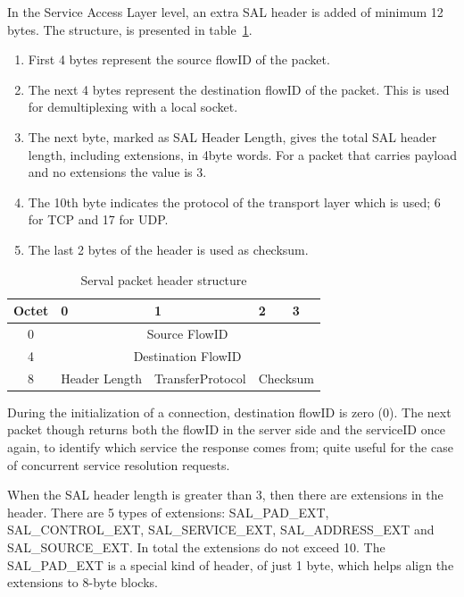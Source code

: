 In the Service Access Layer level, an extra SAL header is added of minimum 12 bytes.
The structure, is presented in table~\ref{table:salheader}.
\begin{enumerate} \itemsep1pt \parskip0pt 
  \item First 4 bytes represent the source flowID of the packet.
  \item The next 4 bytes represent the destination flowID of the packet.
  This is used for demultiplexing with a local socket.
  \item The next byte, marked as SAL Header Length, gives the total SAL header length, including extensions, in 4byte words.
  For a packet that carries payload and no extensions the value is 3.
  \item The 10th byte indicates the protocol of the transport layer which is used; 6 for TCP and 17 for UDP.
  \item The last 2 bytes of the header is used as checksum.
\end{enumerate}

\begin{table}
\begin{center}
  \begin{tabularx}{\linewidth}{|c|X|X|X|X|}
  	\hline
  	Octet &	0 & 1 & 2 & 3 \\ \hline
  	0 & \multicolumn{4}{c|}{Source FlowID}\\ \hline
  	4 & \multicolumn{4}{c|}{Destination FlowID}\\ \hline
  	8 &	Header Length & {Transfer\linebreak Protocol} &	\multicolumn{2}{|c|}{Checksum}	\\
	\hline
  \end{tabularx}
  \caption[Serval packet header structure]{Serval packet header structure}
  \label{table:salheader}
\end{center}
\end{table}

During the initialization of a connection, destination flowID is zero (0).
The next packet though returns both the flowID in the server side and the serviceID once again, to identify which service the response comes from; quite useful for the case of concurrent service resolution requests.

When the SAL header length is greater than 3, then there are extensions in the header.
There are 5 types of extensions: SAL_PAD_EXT, SAL_CONTROL_EXT, SAL_SERVICE_EXT, SAL_ADDRESS_EXT and SAL_SOURCE_EXT.
In total the extensions do not exceed 10.
The SAL_PAD_EXT is a special kind of header, of just 1 byte, which helps align the extensions to 8-byte blocks.

